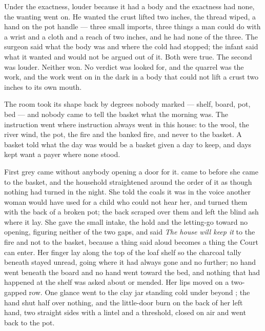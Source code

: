 Under the exactness, louder because it had a body and the exactness had none, the wanting went on. He wanted the crust lifted two inches, the thread wiped, a hand on the pot handle --- three small imports, three things a man could do with a wrist and a cloth and a reach of two inches, and he had none of the three. The surgeon said what the body was and where the cold had stopped; the infant said what it wanted and would not be argued out of it. Both were true. The second was louder. Neither won. No verdict was looked for, and the quarrel was the work, and the work went on in the dark in a body that could not lift a crust two inches to its own mouth.

The room took its shape back by degrees nobody marked --- shelf, board, pot, bed --- and nobody came to tell the basket what the morning was. The instruction went where instruction always went in this house: to the wool, the river wind, the pot, the fire and the banked fire, and never to the basket. A basket told what the day was would be a basket given a day to keep, and days kept want a payer where none stood.

\scenebreak

First grey came without anybody opening a door for it.  came to  before she came to the basket, and the household straightened around the order of it as though nothing had turned in the night. She told the coals it was  in the voice another woman would have used for a child who could not hear her, and turned them with the back of a broken pot; the back scraped over them and left the blind ash where it lay. She gave the small intake, the hold and the letting-go toward no opening, figuring neither of the two gaps, and said \emph{The house will keep it} to the fire and not to the basket, because a thing said aloud becomes a thing the Court can enter. Her finger lay along the top of the loaf shelf so the charcoal tally beneath stayed unread, going where it had always gone and no further; no hand went beneath the board and no hand went toward the bed, and nothing that had happened at the shelf was asked about or mended. Her lips moved on a two-gapped row. One glance went to the clay jar standing cold under  beyond ; the hand shut half over nothing, and the little-door burn on the back of her left hand, two straight sides with a lintel and a threshold, closed on air and went back to the pot.

